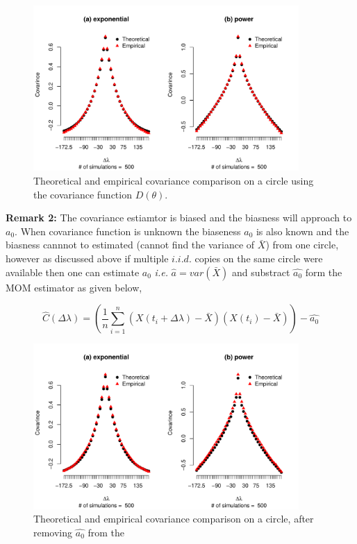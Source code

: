 	      \begin{figure}[H]
	      	\centering
	      	\includegraphics[width=0.9\textwidth]{graphs/covarince_circle_remove_a0}
	      	\caption {Theoretical and empirical covariance comparison on a circle using the covariance function $D(\theta)$.}
	      \end{figure}
	      	      

{\bf Remark 2:} The covariance estiamtor is biased and the biasness will approach to $a_0$. When covariance function is unknown the biaseness $a_0$ is also known and the biasness cannnot to estimated (cannot find the variance of $\bar{X}$) from one circle, however as discussed above if multiple $i.i.d.$ copies on the same circle were available then one can estimate $a_0$ {\em i.e.} $\hat{a} = var(\bar{X})$ and substract $\hat{a_0}$ form the MOM estimator as given below,

\[
\hat{C}(\Delta \lambda) = \left( \frac{1}{n}\sum_{i = 1}^n (X(t_i + \Delta \lambda) - \bar{X})(X(t_i) - \bar{X}) \right) -  \hat{a_0}
\]


	\begin{figure}[H]
	 \centering
	 \includegraphics[width=0.9\textwidth]{graphs/covarince_circle_estimate_a0}
	 \caption {Theoretical and empirical covariance comparison on a circle, after removing $\hat{a_0}$ from the}
	 \end{figure}
	      

